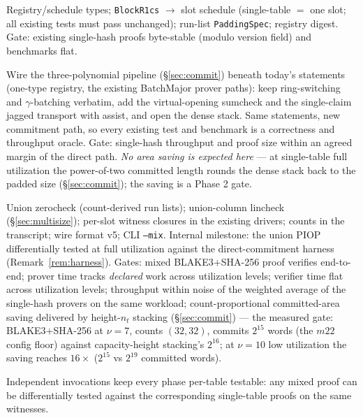 \documentclass[11pt]{article}
\newcommand{\code}[1]{\texttt{#1}}
\theoremstyle{definition}
\begin{document}
\begin{description}[leftmargin=1.6em, style=nextline]
  \item[Phase 0 --- enablers (no behavior change).]
    Registry/schedule types; \code{BlockR1cs} $\to$ slot schedule
    (single-table $=$ one slot; all existing tests must pass unchanged);
    run-list \code{PaddingSpec}; registry digest. Gate: existing
    single-hash proofs byte-stable (modulo version field) and benchmarks
    flat.
  \item[Phase 1 --- jagged under the existing single-table system.]
    Wire the three-polynomial pipeline (\S\ref{sec:commit}) beneath
    today's statements (one-type registry, the existing BatchMajor prover
    paths): keep ring-switching and $\gamma$-batching verbatim, add the
    virtual-opening sumcheck and the single-claim jagged transport with
    assist, and open the dense stack. Same statements, new commitment
    path, so every existing test and benchmark is a correctness and
    throughput oracle. Gate: single-hash throughput and proof size within
    an agreed margin of the direct path. \emph{No area saving is expected
    here} --- at single-table full utilization the power-of-two committed
    length rounds the dense stack back to the padded size
    (\S\ref{sec:commit}); the saving is a Phase 2 gate.
  \item[Phase 2 --- the union PIOP and dynamic counts (mixed proofs ship).]
    Union zerocheck (count-derived run lists); union-column lincheck
    (\S\ref{sec:multisize}); per-slot witness
    closures in the existing drivers; counts in the
    transcript; wire format v5; CLI \code{--mix}. Internal milestone: the
    union PIOP differentially tested at full utilization against the
    direct-commitment harness (Remark~\ref{rem:harness}). Gates: mixed
    BLAKE3$+$SHA-256 proof verifies end-to-end; prover time tracks
    \emph{declared} work across utilization levels; verifier time flat
    across utilization levels; throughput within noise of the weighted
    average of the single-hash provers on the same workload;
    count-proportional committed-area saving delivered by height-$n_t$
    stacking (\S\ref{sec:commit}) --- the measured gate: BLAKE3$+$SHA-256
    at $\nu = 7$, counts $(32, 32)$, commits $2^{15}$ words (the $m22$
    config floor) against capacity-height stacking's $2^{16}$; at
    $\nu = 10$ low utilization the saving reaches $16\times$ ($2^{15}$
    vs $2^{19}$ committed words).
\end{description}

Independent invocations keep every phase per-table testable: any mixed
proof can be differentially tested against the corresponding single-table
proofs on the same witnesses.
\end{document}

